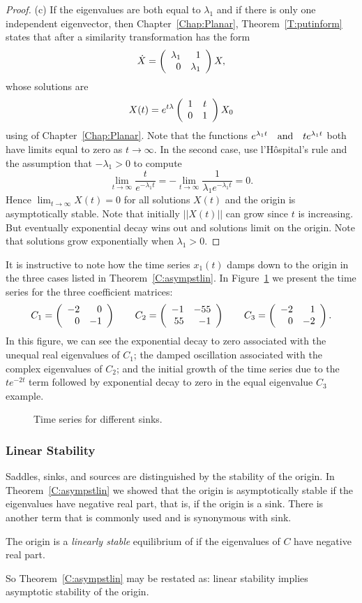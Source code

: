 \documentclass{ximera}
\begin{document}
\begin{proof}
\noindent (c) \quad If the eigenvalues are both equal to $\lambda_1$
and if there is only one independent eigenvector, then
Chapter~\ref{Chap:Planar}, Theorem~\ref{T:putinform} states that after a
similarity transformation  has the form
\[
\dot{X} = \left(\begin{array}{rr} \lambda_1 & 1\\ 0 &\lambda_1\end{array}\right)X,
\]
whose solutions are
\[
X(t) = e^{t\lambda}\left(\begin{array}{cc} 1 & t\\ 0 &1\end{array}\right) X_0
\]
using  of Chapter~\ref{Chap:Planar}. Note that the functions
$e^{\lambda_1 t} \quad\mbox{and}\quad te^{\lambda_1 t}$ both have limits equal to zero as
$t\to\infty$.  In the second case, use l'H\^{o}spital's rule and the
assumption that $-\lambda_1>0$ to compute
\[
\lim_{t\to\infty} \frac{t}{e^{-\lambda_1 t}} =
  -\lim_{t\to\infty} \frac{1}{\lambda_1 e^{-\lambda_1 t}} = 0.
\]
Hence $\lim_{t\to\infty} X(t) =0$ for all solutions $X(t)$ and the origin
is asymptotically stable.  Note that initially $||X(t)||$ can grow since
$t$ is increasing.  But eventually exponential decay wins out and solutions
limit on the origin.   Note that solutions grow exponentially when
$\lambda_1>0$.  \end{proof}

It is instructive to note how the time series $x_1(t)$ damps down to the
origin in the three cases listed in Theorem~\ref{C:asympstlin}.
In Figure~\ref{F:oscil} we present the time series for the three
coefficient matrices:
\[
C_1 = \left(\begin{array}{rr} -2 & 0\\ 0 &-1\end{array}\right) \qquad
C_2 = \left(\begin{array}{rr} -1 & -55\\ 55 &-1\end{array}\right) \qquad
C_3 = \left(\begin{array}{rr} -2 & 1\\ 0 &-2\end{array}\right).
\]
In this figure, we can see the exponential decay to zero associated with the
unequal real eigenvalues of $C_1$; the damped oscillation associated with the
complex eigenvalues of $C_2$; and the initial growth of the time series due
to the $te^{-2t}$ term followed by exponential decay to zero in the equal
eigenvalue $C_3$ example.

\begin{figure}[htb]
           \centerline{%
	   }
           \caption{Time series for different sinks.}
           \label{F:oscil}
\end{figure}


\subsubsection*{Linear Stability}

Saddles, sinks, and sources are distinguished by the stability of the
origin.  In Theorem~\ref{C:asympstlin} we showed that the origin is
asymptotically stable if the eigenvalues have negative real part, that is,
if the origin is a sink.  There is another term that is commonly used and
is synonymous with sink.
\begin{definition} \label{D:linstablin}
The origin is a {\em linearly stable\/} equilibrium of  if the
eigenvalues of $C$ have negative real part.
\end{definition}
So Theorem~\ref{C:asympstlin} may be restated as: linear stability
implies asymptotic stability of the origin.
\end{document}
